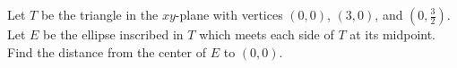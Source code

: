 Let $T$ be the triangle in the $xy$-plane with vertices $\left(0,0\right)$, $\left(3,0\right)$, and $\left(0,\frac{3}{2}\right)$. Let $E$ be the ellipse inscribed in $T$ which meets each side of $T$ at its midpoint. Find the distance from the center of $E$ to $\left(0,0\right)$.
